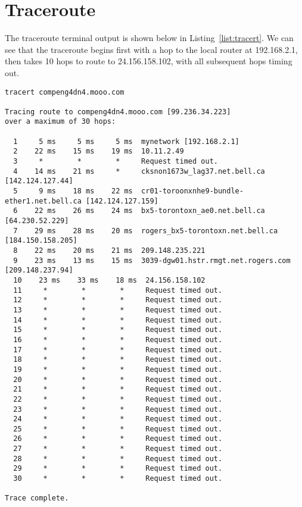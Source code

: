 \section*{Traceroute}
The traceroute terminal output is shown below in Listing~\ref{list:tracert}. We can see that the traceroute begins first with a hop to the local router at 192.168.2.1, then takes 10 hops to route to 24.156.158.102, with all subsequent hops timing out.

\begin{lstlisting}[caption=Traceroute Terminal Output,label=list:tracert]
tracert compeng4dn4.mooo.com

Tracing route to compeng4dn4.mooo.com [99.236.34.223]
over a maximum of 30 hops:

  1     5 ms     5 ms     5 ms  mynetwork [192.168.2.1]
  2    22 ms    15 ms    19 ms  10.11.2.49
  3     *        *        *     Request timed out.
  4    14 ms    21 ms     *     cksnon1673w_lag37.net.bell.ca [142.124.127.44]
  5     9 ms    18 ms    22 ms  cr01-toroonxnhe9-bundle-ether1.net.bell.ca [142.124.127.159]
  6    22 ms    26 ms    24 ms  bx5-torontoxn_ae0.net.bell.ca [64.230.52.229]
  7    29 ms    28 ms    20 ms  rogers_bx5-torontoxn.net.bell.ca [184.150.158.205]
  8    22 ms    20 ms    21 ms  209.148.235.221
  9    23 ms    13 ms    15 ms  3039-dgw01.hstr.rmgt.net.rogers.com [209.148.237.94]
  10    23 ms    33 ms    18 ms  24.156.158.102
  11     *        *        *     Request timed out.
  12     *        *        *     Request timed out.
  13     *        *        *     Request timed out.
  14     *        *        *     Request timed out.
  15     *        *        *     Request timed out.
  16     *        *        *     Request timed out.
  17     *        *        *     Request timed out.
  18     *        *        *     Request timed out.
  19     *        *        *     Request timed out.
  20     *        *        *     Request timed out.
  21     *        *        *     Request timed out.
  22     *        *        *     Request timed out.
  23     *        *        *     Request timed out.
  24     *        *        *     Request timed out.
  25     *        *        *     Request timed out.
  26     *        *        *     Request timed out.
  27     *        *        *     Request timed out.
  28     *        *        *     Request timed out.
  29     *        *        *     Request timed out.
  30     *        *        *     Request timed out.

Trace complete.
\end{lstlisting}

